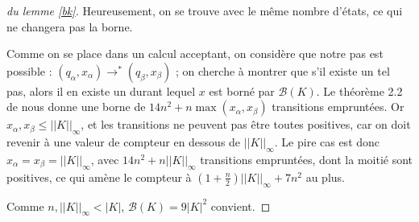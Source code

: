 \documentclass[12pt, a4paper]{article}
\newcommand{\Kinf}{||K||_{\infty}}
\begin{document}
\begin{proof}[du lemme \ref{bk}]
        
        Heureusement, on se trouve avec le même nombre d'états, ce qui ne changera pas la borne.

        Comme on se place dans un calcul acceptant, on considère que notre pas est possible : $(q_\alpha,x_\alpha) \rightarrow^* (q_\beta,x_\beta)$ ; on cherche à montrer que s'il existe un tel pas, alors il en existe un durant lequel $x$ est borné par $\mathcal{B}(K)$.
        Le théorème 2.2 de \cite{shortpathOCS} nous donne une borne de $14n^2 + n \max (x_\alpha,x_\beta)$ transitions empruntées. Or $x_\alpha,x_\beta \leq \Kinf$, et les transitions ne peuvent pas être toutes positives, car on doit revenir à une valeur de compteur en dessous de $\Kinf$. Le pire cas est donc $x_\alpha = x_\beta = \Kinf$, avec $14n^2+n\Kinf$ transitions empruntées, dont la moitié sont positives, ce qui amène le compteur à $(1+\frac{n}{2})\Kinf + 7n^2$ au plus.
        
        Comme $n,\Kinf < |K|$, $\mathcal{B}(K) = 9|K|^2$ convient.
       
    \end{proof}
\end{document}
